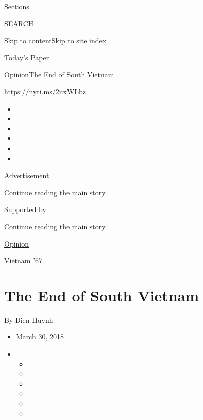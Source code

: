 Sections

SEARCH

\protect\hyperlink{site-content}{Skip to
content}\protect\hyperlink{site-index}{Skip to site index}

\href{https://myaccount.nytimes3xbfgragh.onion/auth/login?response_type=cookie\&client_id=vi}{}

\href{https://www.nytimes3xbfgragh.onion/section/todayspaper}{Today's
Paper}

\href{/section/opinion}{Opinion}\textbar{}The End of South Vietnam

\url{https://nyti.ms/2uxWLbz}

\begin{itemize}
\item
\item
\item
\item
\item
\item
\end{itemize}

Advertisement

\protect\hyperlink{after-top}{Continue reading the main story}

Supported by

\protect\hyperlink{after-sponsor}{Continue reading the main story}

\href{/section/opinion}{Opinion}

\href{/column/vietnam-67}{Vietnam '67}

\hypertarget{the-end-of-south-vietnam}{%
\section{The End of South Vietnam}\label{the-end-of-south-vietnam}}

By Dien Huynh

\begin{itemize}
\item
  March 30, 2018
\item
  \begin{itemize}
  \item
  \item
  \item
  \item
  \item
  \item
  \end{itemize}
\end{itemize}

